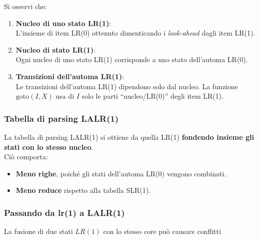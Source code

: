 Si osservi che:
\begin{enumerate}
    \item \textbf{Nucleo di uno stato LR(1)}: \\
    L'insieme di item LR(0) ottenuto dimenticando i \textit{look-ahead} dagli item LR(1).
    
    \item \textbf{Nucleo di stato LR(1)}: \\
    Ogni nucleo di uno stato LR(1) corrisponde a uno stato dell'automa LR(0).
    
    \item \textbf{Transizioni dell'automa LR(1)}: \\
    Le transizioni dell'automa LR(1) dipendono solo dal nucleo. La funzione \( \text{goto}(I, X) \) usa di \( I \) solo le parti ``nucleo/LR(0)'' degli item LR(1).
\end{enumerate}

\subsubsection{Tabella di parsing LALR(1)}
La tabella di parsing LALR(1) si ottiene da quella LR(1) \textbf{fondendo insieme gli stati con lo stesso nucleo}. \\
Ciò comporta:
\begin{itemize}
    \item \textbf{Meno righe}, poiché gli stati dell'automa LR(0) vengono combinati.
    \item \textbf{Meno reduce} rispetto alla tabella SLR(1).
\end{itemize}


\subsubsection{Passando da lr(1) a LALR(1)}

La fusione di due stati $LR(1)$ con lo stesso core può causare conflitti

